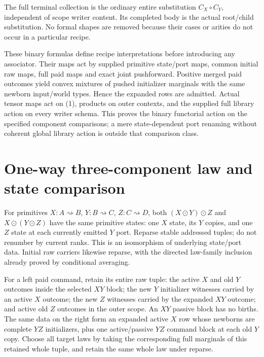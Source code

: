 \documentclass[11pt]{article}
\begin{document}
The full terminal collection is the ordinary entire substitution $C_X\circ C_Y$, independent of scope writer content. Its completed body is the actual root/child substitution. No formal shapes are removed because their cases or arities do not occur in a particular recipe.

These binary formulas define recipe interpretations before introducing any associator. Their maps act by supplied primitive state/port maps, common initial raw maps, full paid maps and exact joint pushforward. Positive merged paid outcomes yield convex mixtures of pushed initializer marginals with the same newborn input/world types. Hence the expanded rows are admitted. Actual tensor maps act on (1), products on outer contexts, and the supplied full library action on every writer schema. This proves the binary functorial action on the specified component comparisons; a mere state-dependent port renaming without coherent global library action is outside that comparison class.

\section{One-way three-component law and state comparison}
For primitives $X:A\rightsquigarrow B$, $Y:B\rightsquigarrow C$, $Z:C\rightsquigarrow D$, both $(X\odot Y)\odot Z$ and $X\odot(Y\odot Z)$ have the same primitive states: one $X$ state, its $Y$ copies, and one $Z$ state at each currently emitted $Y$ port. Reparse stable addressed tuples; do not renumber by current ranks. This is an isomorphism of underlying state/port data. Initial raw carriers likewise reparse, with the directed law-family inclusion already proved by conditional averaging.

For a left paid command, retain its entire raw tuple: the active $X$ and old $Y$ outcomes inside the selected $XY$ block; the new $Y$ initializer witnesses carried by an active $X$ outcome; the new $Z$ witnesses carried by the expanded $XY$ outcome; and active old $Z$ outcomes in the outer scope. An $XY$ passive block has no births. The same data on the right form an expanded active $X$ row whose newborns are complete $YZ$ initializers, plus one active/passive $YZ$ command block at each old $Y$ copy. Choose all target laws by taking the corresponding full marginals of this retained whole tuple, and retain the same whole law under reparse.
\end{document}
